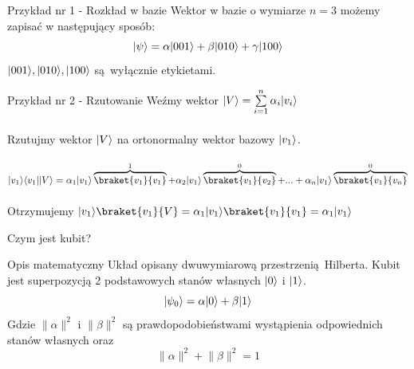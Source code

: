 \documentclass{beamer}
\DeclarePairedDelimiter\bra{\langle}{\rvert}
\DeclarePairedDelimiter\ket{\lvert}{\rangle}
\begin{document}
	\begin{frame}
		\begin{block}{Przykład nr 1 - Rozkład w bazie}
			\vspace{0.5em}
			Wektor w bazie o wymiarze $n=3$ możemy zapisać w następujący sposób:
				\begin{equation*}
					\ket{\psi} = \alpha\ket{001} + \beta\ket{010} + \gamma\ket{100}
				\end{equation*}
			$\ket{001},\ket{010},\ket{100}$ są wyłącznie etykietami.
			
			\vspace{0.5em}
		\end{block}
	
		\begin{block}{Przykład nr 2 - Rzutowanie}
			\vspace{0.5em}
			Weźmy wektor  $\ket{V} = \sum\limits_{i=1}^n \alpha_{i}\ket{v_{i}}$\\~\\ 
			Rzutujmy wektor $\ket{V}$ na ortonormalny wektor bazowy $\ket{v_{1}}$.\\~\\
			$\ket{v_{1}}\bra{v_{1}}\ket{V}=
			\alpha_{1}\ket{v_{1}}\overbrace{\braket{v_{1}}{v_{1}}}^{1} +
			 \alpha_{2}\ket{v_{1}}\overbrace{\braket{v_{1}}{v_{2}}}^{0} +...+
			 \alpha_{n}\ket{v_{1}}\overbrace{\braket{v_{1}}{v_{n}}}^{0} 
			$\\~\\
			Otrzymujemy $\ket{v_{1}}\braket{v_{1}}{V}= \alpha_{1}\ket{v_{1}}\braket{v_{1}}{v_{1}}=\alpha_{1}\ket{v_{1}}$
			
			\vspace{0.5em}
		\end{block}
	\end{frame}
			
	\begin{frame}{Czym jest kubit?}
		
		\begin{block}{Opis matematyczny}
		\vspace{0.5em}
		Układ opisany dwuwymiarową przestrzenią Hilberta. Kubit jest superpozycją 2 podstawowych stanów własnych $\ket{0}$ i $\ket{1}$.\\
		\begin{equation*}
			\ket{\psi_{0}} = \alpha\ket{0} + \beta\ket{1}
		\end{equation*}
		Gdzie $\lVert\alpha\rVert^{2}$ i $\lVert\beta\rVert^{2}$ są prawdopodobieństwami wystąpienia odpowiednich stanów własnych oraz $$\lVert\alpha\rVert^{2} + \lVert\beta\rVert^{2} = 1$$
		
		\vspace{0.5em}
		\end{block}			
	\end{frame}
\end{document}
